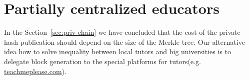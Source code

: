 \appendix
\section{Partially centralized educators}

In the Section~\ref{sec:priv-chain} we have concluded that the cost of the private hash publication should depend on the size of the Merkle tree. Our alternative idea how to solve inequality between local tutors and big universities is to delegate block generation to the special platforms for tutors(e.g. \url{teachmeplease.com}).